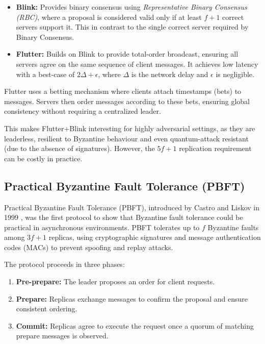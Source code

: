 \begin{itemize}
    \item \textbf{Blink:} Provides binary consensus using \emph{Representative Binary Consensus (RBC)}, where a proposal is considered valid only if at least $f+1$ correct servers support it. This in contrast to the single correct server required by Binary Consensus.
    \item \textbf{Flutter:} Builds on Blink to provide total-order broadcast, ensuring all servers agree on the same sequence of client messages.  
    It achieves low latency with a best-case of $2\Delta + \epsilon$, where $\Delta$ is the network delay and $\epsilon$ is negligible.
\end{itemize}

Flutter uses a betting mechanism where clients attach timestamps (bets) to messages. Servers then order messages according to these bets, ensuring global consistency without requiring a centralized leader.  

This makes Flutter+Blink interesting for highly adversarial settings, as they are leaderless, resilient to Byzantine behaviour and even quantum-attack resistant (due to the absence of signatures). However, the $5f+1$ replication requirement can be costly in practice.

\subsection{Practical Byzantine Fault Tolerance (PBFT)}

Practical Byzantine Fault Tolerance (PBFT), introduced by Castro and Liskov in 1999 \cite{castro1999practical}, was the first protocol to show that Byzantine fault tolerance could be practical in asynchronous environments.  
PBFT tolerates up to $f$ Byzantine faults among $3f+1$ replicas, using cryptographic signatures and message authentication codes (MACs) to prevent spoofing and replay attacks.  

The protocol proceeds in three phases:
\begin{enumerate}
    \item \textbf{Pre-prepare:} The leader proposes an order for client requests.
    \item \textbf{Prepare:} Replicas exchange messages to confirm the proposal and ensure consistent ordering.
    \item \textbf{Commit:} Replicas agree to execute the request once a quorum of matching prepare messages is observed.
\end{enumerate}

